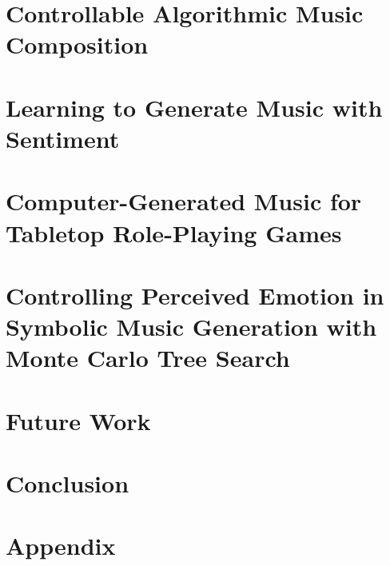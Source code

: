 \documentclass[11pt]{ucscthesis}
\begin{document}
\chapter{Controllable Algorithmic Music Composition}
\label{ch:related}


\chapter{Learning to Generate Music with Sentiment}
\label{ch:ismir19}


\chapter{Computer-Generated Music for Tabletop Role-Playing Games}
\label{ch:aiide20}


\chapter{Controlling Perceived Emotion in Symbolic Music Generation with Monte Carlo Tree Search}
\label{ch:ismir21}


% 

\chapter{Future Work}
\label{ch:future}


\chapter{Conclusion}
\label{ch:conclusion}


\appendix
\chapter{Appendix}
\label{ch:conclusion}




\def\baselinestretch{1.0}\large\normalsize

% 


\end{document}
